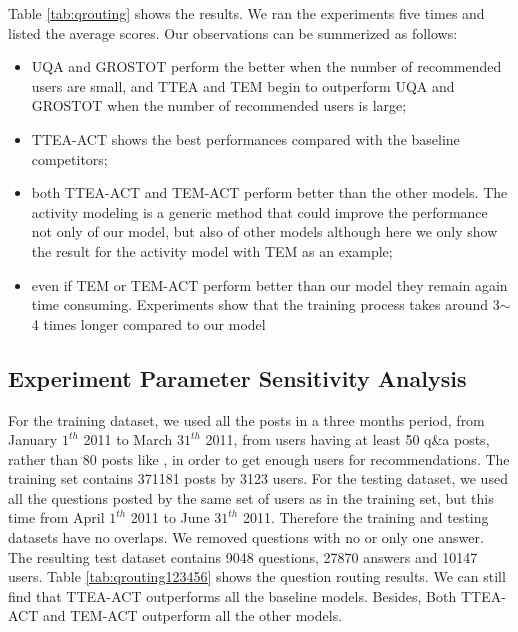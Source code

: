 {{{{{{{%

Table \ref{tab:qrouting} shows the results. We ran the experiments five times and listed the average scores. Our observations can be summerized as follows:
\begin{itemize}
    \item UQA and GROSTOT perform the better when the number of recommended users are small, and TTEA and TEM begin to outperform UQA and GROSTOT when the number of recommended users is large;
    \item TTEA-ACT shows the best performances compared with the baseline competitors;
    \item both TTEA-ACT and TEM-ACT perform better than the other models. The activity modeling is a generic method that could improve the performance not only of our model, but also of other models although here we only show the result for the activity model with TEM as an example;
    \item even if TEM or TEM-ACT perform better than our model they remain again time consuming. Experiments show that the training process takes around 3$\sim$4 times longer compared to our model
\end{itemize}   


\subsection{Experiment Parameter Sensitivity Analysis}
\label{sec:parasetting}
For the training dataset, we used all the posts in a three months period, from January $1^{th}$ 2011 to March $31^{th}$ 2011, from users having at least 50 q\&a posts, rather than 80 posts like \cite{yang2013cqarank}, in order to get enough users for recommendations. The training set contains 371181 posts by 3123 users. For the testing dataset, we used all the questions posted by the same set of users as in the training set, but this time from April $1^{th}$ 2011 to June $31^{th}$ 2011. Therefore the training and testing datasets have no overlaps. We removed questions with no or only one answer. The resulting test dataset contains 9048 questions, 27870 answers and 10147 users. 
Table \ref{tab:qrouting123456} shows the question routing results. We can still find that TTEA-ACT outperforms all the baseline models. Besides, Both TTEA-ACT and TEM-ACT outperform all the other models. 

}}}}}}}
